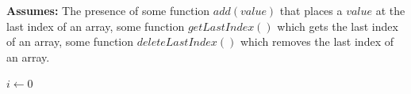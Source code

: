 \documentclass{article}
\renewcommand{\_}{\ifincsname_\else\legacyunderscore\fi}
\begin{document}
\begin{algorithm}[!h]
    \DontPrintSemicolon
    \caption{$cutAndAddChains(chains, numChains)$}
    \label{alg:sp500}
    \textbf{Assumes:} The presence of some function $add(value)$ that places a $value$ at the last index of an array, some function $getLastIndex()$ which gets the last index of an array, some function $deleteLastIndex()$ which removes the last index of an array.
    \BlankLine

    $i \gets 0$\\

    \BlankLine
    
\end{algorithm} 
\end{document}
